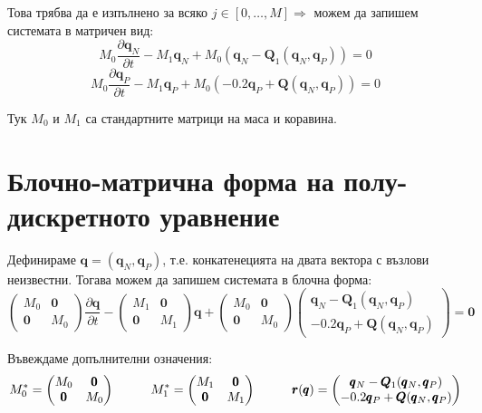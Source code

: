 \documentclass[fleqn,12pt]{article}
\begin{document}
Това трябва да е изпълнено за всяко $j \in [0, \dots, M] \Rightarrow$ можем да запишем системата в матричен вид:
\[ M_0 \frac{\partial \pmb{q}_{N}}{\partial t} - M_1 \pmb{q}_N + M_0 (\pmb{q}_N - \pmb{Q}_1(\pmb{q}_N, \pmb{q}_P)) = 0\]
\[ M_0 \frac{\partial \pmb{q}_{P}}{\partial t} - M_1 \pmb{q}_P + M_0 (-0.2 \pmb{q}_P + \pmb{Q}(\pmb{q}_N, \pmb{q}_P)) = 0\]

Тук $M_0$ и $M_1$ са стандартните матрици на маса и коравина. 

\section{Блочно-матрична форма на полу-дискретното уравнение}
Дефинираме $\pmb{q} = (\pmb{q}_N, \pmb{q}_P)$, т.е.
конкатенецията на двата вектора с възлови неизвестни. Тогава можем да запишем системата в блочна форма:
\[ \begin{pmatrix} M_0 & \pmb{0} \\ \pmb{0} & M_0 \end{pmatrix} \frac{\partial \pmb{q}}{\partial t}
-  \begin{pmatrix} M_1 & \pmb{0} \\ \pmb{0} & M_1 \end{pmatrix} \pmb{q} 
+ \begin{pmatrix} M_0 & \pmb{0} \\ \pmb{0} & M_0 \end{pmatrix} \begin{pmatrix} \pmb{q}_N - \pmb{Q}_1(\pmb{q}_N, \pmb{q}_P) \\ -0.2 \pmb{q}_P + \pmb{Q}(\pmb{q}_N, \pmb{q}_P) \end{pmatrix} = \pmb{0} \]

Въвеждаме допълнителни означения:
\[ M_0^* = \begin{pmatrix} M_0 & \pmb{0} \\ \pmb{0} & M_0 \end{pmatrix} \hspace{10mm}
M_1^* = \begin{pmatrix} M_1 & \pmb{0} \\ \pmb{0} & M_1 \end{pmatrix} \hspace{10mm}
\pmb{r}(\pmb{q}) = \begin{pmatrix} \pmb{q}_N - \pmb{Q}_1(\pmb{q}_N, \pmb{q}_P) \\ -0.2 \pmb{q}_P + \pmb{Q}(\pmb{q}_N, \pmb{q}_P) \end{pmatrix} \]
\end{document}
